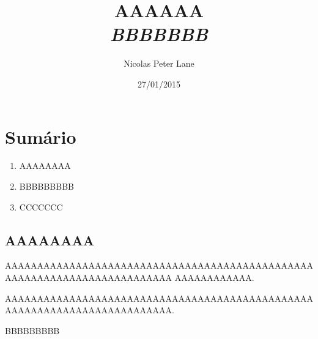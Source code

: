 \documentclass[a4paper,10pt]{article}
\title{AAAAAA\\ \emph{BBBBBBB}}
\author{Nicolas Peter Lane}
\date{27/01/2015}
\begin{document}
\maketitle

\section*{Sum\'ario}

	\begin{enumerate}
	\item{AAAAAAAA}
	\item{BBBBBBBBB}
	\item{CCCCCCC}
	\end{enumerate}
	
\clearpage
\begin{center} \section*{AAAAAAAA} \end{center}

AAAAAAAAAAAAAAAAAAAAAAAAAAAAAAAAAAAAAAAAAAAAAAAAAAAAAAAAAAAAAAAAAAAAAAAAAA
AAAAAAAAAAAA. 

AAAAAAAAAAAAAAAAAAAAAAAAAAAAAAAAAAAAAAAAAAAAAAAAAAAAAAAAAAAAAAAAAAAAAAAAAA.

\clearpage

\begin{center}{BBBBBBBBB} \end{center}
\end{document}
